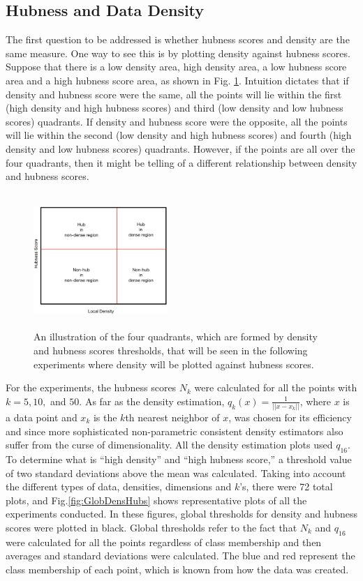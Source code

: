 \documentclass[graybox]{svmult}
\begin{document}
\subsection{Hubness and Data Density}
\label{sec:4.1}

The first question to be addressed is whether hubness scores and density are the same measure. One way to see this is by plotting density against hubness scores. Suppose that there is a low density area, high density area, a low hubness score area and a high hubness score area, as shown in Fig. \ref{fig:DensHubInt}. Intuition dictates that if density and hubness score were the same, all the points will lie within the first (high density and high hubness scores) and third (low density and low hubness scores) quadrants. If density and hubness score were the opposite, all the points will lie within the second (low density and high hubness scores) and fourth (high density and low hubness scores) quadrants. However, if the points are all over the four quadrants, then it might be telling of a different relationship between density and hubness scores. 

\begin{figure}
\centering
\includegraphics[width=2in,height=2in]{../fig/DensHub-Intuition.png}
\caption{An illustration of the four quadrants, which are formed by density and hubness scores thresholds, that will be seen in the following experiments where density will be plotted against hubness scores.}\label{fig:DensHubInt}
\end{figure}

For the experiments, the hubness scores $N_k$ were calculated for all the points with $k=5,10,$ and $50$. As far as the density estimation, $q_k(x) = \frac{1}{||x-x_k||}$, where $x$ is a data point and $x_k$ is the $k$th nearest neighbor of $x$, was chosen for its efficiency and since more sophisticated non-parametric consistent density estimators also suffer from the curse of dimensionality. All the density estimation plots used $q_{16}$. To determine what is ``high density'' and ``high hubness score,'' a threshold value of two standard deviations above the mean was calculated. Taking into account the different types of data, densities, dimensions and $k$'s, there were 72 total plots, and Fig.\ref{fig:GlobDensHubs} shows representative plots of all the experiments conducted. In these figures, global thresholds for density and hubness scores were plotted in black. Global thresholds refer to the fact that $N_k$ and $q_{16}$ were calculated for all the points regardless of class membership and then averages and standard deviations were calculated. The blue and red represent the class membership of each point, which is known from how the data was created. 
\end{document}
